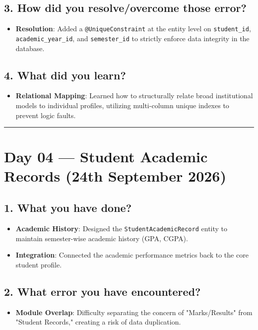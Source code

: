 \documentclass[12pt]{article}
\begin{document}
\subsection*{3. How did you resolve/overcome those error?}
\begin{itemize}
    \item \textbf{Resolution}: Added a \texttt{@UniqueConstraint} at the entity level on \texttt{student\_id}, \texttt{academic\_year\_id}, and \texttt{semester\_id} to strictly enforce data integrity in the database.
\end{itemize}

\subsection*{4. What did you learn?}
\begin{itemize}
    \item \textbf{Relational Mapping}: Learned how to structurally relate broad institutional models to individual profiles, utilizing multi-column unique indexes to prevent logic faults.
\end{itemize}

\vspace{0.5cm}
\hrule
\vspace{0.5cm}

\section*{Day 04 --- Student Academic Records (24th September 2026)}

\subsection*{1. What you have done?}
\begin{itemize}
    \item \textbf{Academic History}: Designed the \texttt{StudentAcademicRecord} entity to maintain semester-wise academic history (GPA, CGPA).
    \item \textbf{Integration}: Connected the academic performance metrics back to the core student profile.
\end{itemize}

\subsection*{2. What error you have encountered?}
\begin{itemize}
    \item \textbf{Module Overlap}: Difficulty separating the concern of "Marks/Results" from "Student Records," creating a risk of data duplication.
\end{itemize}
\end{document}

